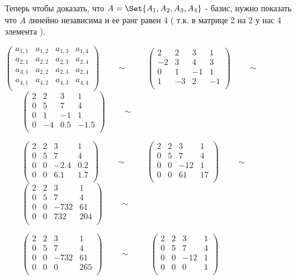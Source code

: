 Теперь чтобы доказать, что $A = \Set{A_1, A_2, A_3, A_4}$ - базис, нужно показать что $A$ линейно независима и ее ранг равен 4 ( т.к. в матрице 2 на 2 у нас 4 элемента ).

$\begin{pmatrix}
a_{1, 1} & a_{1,2} & a_{1,3} & a_{1,4}\\
a_{2, 1} & a_{2,2} & a_{2,3} & a_{2,4}\\
a_{3, 1} & a_{2,2} & a_{2,3} & a_{2,4}\\
a_{4, 1} & a_{4,2} & a_{4,3} & a_{4,4}\\
\end{pmatrix}\qquad \sim $
$\qquad\begin{pmatrix}
2 & 2 & 3 & 1\\
-2 & 3 & 4 & 3\\
0 & 1 & -1 & 1\\
1 & -3 & 2 & -1\\
\end{pmatrix}\qquad \sim $
$\qquad\begin{pmatrix}
2 & 2 & 3 & 1\\
0 & 5 & 7 & 4\\
0 & 1 & -1 & 1\\
0 & -4 & 0.5 & -1.5\\
\end{pmatrix}\qquad \sim $

$\qquad\begin{pmatrix}
2 & 2 & 3 & 1\\
0 & 5 & 7 & 4\\
0 & 0 & -2.4 & 0.2\\
0 & 0 & 6.1 & 1.7\\
\end{pmatrix}\qquad \sim $
$\qquad\begin{pmatrix}
2 & 2 & 3 & 1\\
0 & 5 & 7 & 4\\
0 & 0 & -12 & 1\\
0 & 0 & 61 & 17\\
\end{pmatrix}\qquad \sim $
$\qquad\begin{pmatrix}
2 & 2 & 3 & 1\\
0 & 5 & 7 & 4\\
0 & 0 & -732 & 61\\
0 & 0 & 732 & 204\\
\end{pmatrix}\qquad \sim $

$\qquad\begin{pmatrix}
2 & 2 & 3 & 1\\
0 & 5 & 7 & 4\\
0 & 0 & -732 & 61\\
0 & 0 & 0 & 265\\
\end{pmatrix}\qquad \sim $
$\qquad\begin{pmatrix}
2 & 2 & 3 & 1\\
0 & 5 & 7 & 4\\
0 & 0 & -12 & 1\\
0 & 0 & 0 & 1\\
\end{pmatrix}\qquad $

